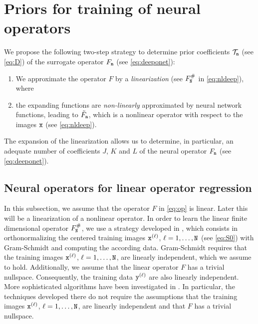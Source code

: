 \documentclass[10pt]{article}
\numberwithin{equation}{section}
\theoremstyle{nonumberplain}
\newcommand{\y}{{\tt y}}
\newcommand{\n}{{\tt n}}
\newcommand{\x}{{\tt x}}
\newcommand{\no}{{\tt N}}
\begin{document}
\section{Priors for training of neural operators} \label{se:orthogonal}
We propose the following two-step strategy to determine prior coefficients $\mathcal{T}_\n$ (see \autoref{eq:D}) of the surrogate operator $F_\n$ (see \autoref{eq:deeponet}): 
	\begin{enumerate}
	\item We approximate the operator $F$ by a \emph{linearization} (see $F_\no^\#$ in \autoref{eq:nldeep}), where
	\item the expanding functions are \emph{non-linearly} approximated by neural network functions, leading to $\tilde{F}_\n$, which is a nonlinear operator with respect to the images $\x$ (see \autoref{eq:nldeep}).
\end{enumerate}
The expansion of the linearization allows us to determine, in particular, an adequate number of coefficients $J$, $K$ and $L$ of the neural operator $F_\n$ (see \autoref{eq:deeponet}).

\subsection{Neural operators for linear operator regression} \label{ss:lorl}
In this subsection, we assume that the operator $F$ in \autoref{eq:op} is linear. Later this will be a linearization of a nonlinear operator. In order to learn the linear finite dimensional operator $F_\no^\#$, we use a strategy developed in \cite{AspFriSch24_preprint}, which consists in orthonormalizing the centered training images $\x^{(\ell)}$, $\ell=1,\dots,\no$ (see \autoref{eq:S0}) with Gram-Schmidt and computing the according data. Gram-Schmidt requires that the training images $\x^{(\ell)}$, $\ell = 1,\ldots,\no$, are linearly independent, which we assume to hold. Additionally, we assume that the linear operator $F$ has a trivial nullspace. Consequently, the training data $\y^{(\ell)}$ are also linearly independent. More sophisticated algorithms have been investigated in \cite{HanSch26}. In particular, the techniques developed there do not require the assumptions that the training images $\x^{(\ell)}$, $\ell = 1,\ldots,\no$, are linearly independent and that $F$ has a trivial nullspace. 
\end{document}
